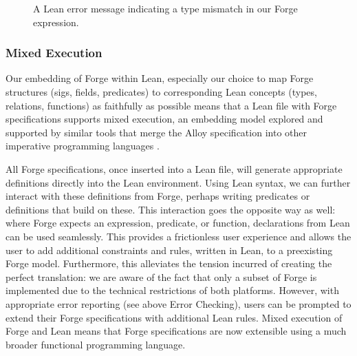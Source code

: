 \begin{figure}[h!]
  \centering
  \caption{A Lean error message indicating a type mismatch in our Forge expression.}
  \label{fig:sc-type-mismatch}
\end{figure}

\subsubsection{Mixed Execution}

Our embedding of Forge within Lean, especially our choice to map Forge structures (sigs, fields, predicates) to corresponding Lean concepts (types, relations, functions) as faithfully as possible means that a Lean file with Forge specifications supports mixed execution, an embedding model explored and supported by similar tools that merge the Alloy specification into other imperative programming languages \cite{milicevic2010executable,milicevic2014alpha,milicevic2015advancing}. 

All Forge specifications, once inserted into a Lean file, will generate appropriate definitions directly into the Lean environment. Using Lean syntax, we can further interact with these definitions from Forge, perhaps writing predicates or definitions that build on these. This interaction goes the opposite way as well: where Forge expects an expression, predicate, or function, declarations from Lean can be used seamlessly. This provides a frictionless user experience and allows the user to add additional constraints and rules, written in Lean, to a preexisting Forge model. Furthermore, this alleviates the tension incurred of creating the perfect translation: we are aware of the fact that only a subset of Forge is implemented due to the technical restrictions of both platforms. However, with appropriate error reporting (see above Error Checking), users can be prompted to extend their Forge specifications with additional Lean rules. Mixed execution of Forge and Lean means that Forge specifications are now extensible using a much broader functional programming language. 

